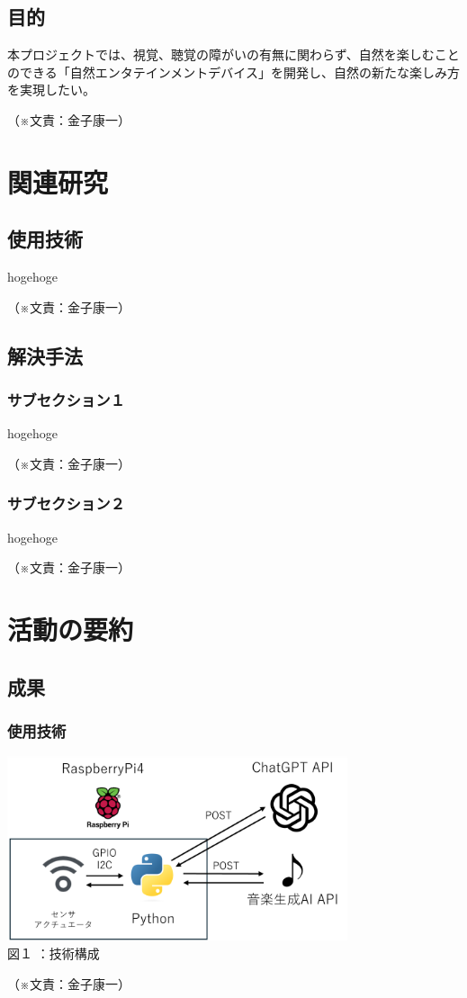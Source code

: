 \documentclass[11pt,a4paper]{report}
\newcommand{\Writer}[1]{
  \normalsize
  \begin{flushright}
    （※文責：#1）
  \end{flushright}
}
\begin{document}
\section{目的}
\noindent\space
本プロジェクトでは、視覚、聴覚の障がいの有無に関わらず、自然を楽しむことのできる「自然エンタテインメントデバイス」を開発し、自然の新たな楽しみ方を実現したい。
\Writer{金子康一}

\chapter{関連研究}
\section{使用技術}
\noindent\space
hogehoge
\Writer{金子康一}

\section{解決手法}
\subsection{サブセクション１}
\noindent
hogehoge
\Writer{金子康一}

\subsection{サブセクション２}
\noindent
hogehoge
\Writer{金子康一}

\chapter{活動の要約}
\section{成果}
\noindent\space
\subsection{使用技術}
\begin{center}
  \includegraphics[width=100mm]{images/tech-conf.png}\\
  図１  ：技術構成
\end{center}
\Writer{金子康一}
\end{document}
